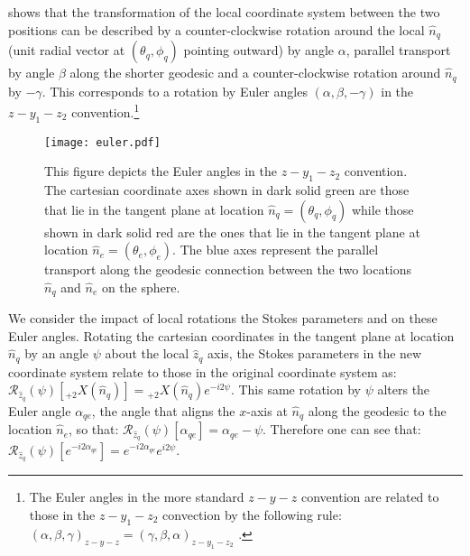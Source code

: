  shows that the transformation of the local coordinate system between the two positions can be described by a counter-clockwise rotation around the local $\hat n_q$ (unit radial vector at $(\theta_q,\phi_q)$ pointing outward) by angle $\alpha$, parallel transport by angle $\beta$ along the shorter geodesic and a counter-clockwise rotation around $\hat n_q$ by $-\gamma$.  This corresponds to a rotation by Euler angles $(\alpha,\beta,-\gamma)$ in the $z-y_1-z_2$ convention.\footnote{The Euler angles in the more standard $z-y-z$ convention are related to those in the $z-y_1-z_2$ convection by the following rule: $(\alpha,\beta,\gamma)_{z-y-z} =(\gamma,\beta,\alpha)_{z-y_1-z_2}$ \cite{varshalovich}.}
%
\begin{figure}%
\centering
\texttt{[image: euler.pdf]}
\caption{This figure depicts the Euler angles in the $z-y_1-z_2$ convention. The cartesian coordinate axes shown in dark solid green are those that lie in the tangent plane at location $\hat{n}_q = (\theta_q, \phi_q)$ while those shown in dark solid red are the ones that lie in the tangent plane at location $\hat{n}_e = (\theta_e, \phi_e)$. The blue axes represent the parallel transport along the geodesic connection between the two locations $\hat{n}_q$ and $\hat{n}_e$ on the sphere.}
\label{fig:euler_angles}
\end{figure}
%

We consider the impact of local rotations  the Stokes parameters and on these Euler angles. Rotating the cartesian coordinates in the tangent plane at location $\hat{n}_q$ by an angle $\psi$ about the local $\hat{z}_q$ axis, the Stokes parameters in the new coordinate system relate to those in the original coordinate system as:
$\mathcal{R}_{\hat{z}_q}(\psi)[{}_{+2}X(\hat{n}_q)] =  {}_{+2}X(\hat{n}_q) e^{-i2\psi} $.
This same rotation by $\psi$ alters the Euler angle $\alpha_{qe}$, the angle that aligns the $x$-axis at $\hat{n}_q$ along the geodesic to the location $\hat{n}_e$, so that: $\mathcal{R}_{\hat{z}_q}(\psi)[\alpha_{qe}] = \alpha_{qe} - \psi$.  Therefore one can see that: $\mathcal{R}_{\hat{z}_q}(\psi)[e^{-i2\alpha_{qe}}] =  e^{-i2\alpha_{qe}} e^{i2\psi}$.

